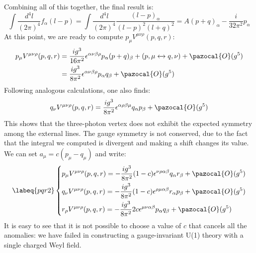 \documentclass[../main.tex]{subfiles}
\begin{document}
Combining all of this together, the final result is:
\[
\int\frac{d^4l}{(2\pi)^4}f_\alpha(l-p)=\int\frac{d^4l}{(2\pi)^4}\frac{(l-p)_\alpha}{(l-p)^2(l+q)^2}=A(p+q)_\alpha-\frac{i}{32\pi^2}p_\alpha
\]
At this point, we are ready to compute $p_\mu V^{\mu\nu\rho}(p,q,r)$:
\begin{align*}
p_\mu V^{\mu\nu\rho}(p,q,r)&=\frac{ig^3}{16\pi^2}\epsilon^{\alpha\nu\beta\rho}p_\alpha(p+q)_\beta+(p,\mu\xleftrightarrow[]{}q,\nu)+\pazocal{O}(g^5)\\
&=\frac{ig^3}{8\pi^2}\epsilon^{\alpha\nu\beta\rho}p_\alpha q_\beta+\pazocal{O}(g^5)
\end{align*}
Following analogous calculations, one also finds:
\[
q_\nu V^{\mu\nu\rho}(p,q,r)=\frac{ig^3}{8\pi^2}\epsilon^{\alpha\rho\beta\mu}q_\alpha p_\beta+\pazocal{O}(g^5)
\]
This shows that the three-photon vertex does not exhibit the expected symmetry among the external lines. The gauge symmetry is not conserved, due to the fact that the integral we computed is divergent and making a shift changes its value. We can set $a_\mu=c(p_\mu-q_\mu)$ and write:
\begin{equation}
\labeq{pqr2}
\left\{
\begin{aligned}
&p_\mu V^{\mu\nu\rho}(p,q,r)=-\frac{ig^3}{8\pi^2}(1-c)\epsilon^{\nu\rho\alpha\beta}q_\alpha r_\beta+\pazocal{O}(g^5)\\
&q_\nu V^{\mu\nu\rho}(p,q,r)=-\frac{ig^3}{8\pi^2}(1-c)\epsilon^{\rho\mu\alpha\beta}r_\alpha p_\beta+\pazocal{O}(g^5)\\
&r_\rho V^{\mu\nu\rho}(p,q,r)=-\frac{ig^3}{8\pi^2}2c\epsilon^{\mu\nu\alpha\beta}p_\alpha q_\beta+\pazocal{O}(g^5)
\end{aligned}
\right.
\end{equation}
It is easy to see that it is not possible to choose a value of $c$ that cancels all the anomalies: we have failed in constructing a gauge-invariant U(1) theory with a single charged Weyl field.
\end{document}
